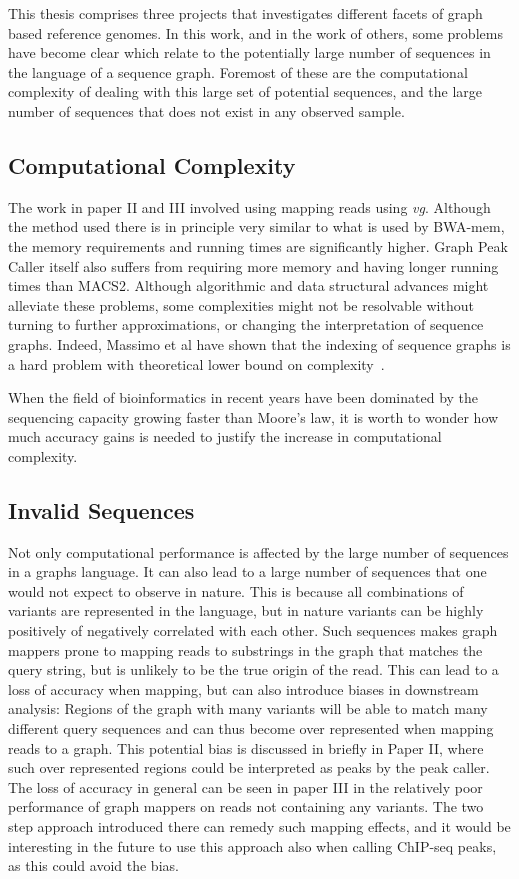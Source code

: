 This thesis comprises three projects that investigates different facets of graph based reference genomes.
In this work, and in the work of others, some problems have become clear which relate to the potentially large number of sequences in the language of a sequence graph. Foremost of these are the computational complexity of dealing with this large set of potential sequences, and the large number of sequences that does not exist in any observed sample.

\subsection{Computational Complexity}
The work in paper II and III involved using mapping reads using \emph{vg}.
Although the method used there is in principle very similar to what is used by BWA-mem, the memory requirements and running times are significantly higher.
Graph Peak Caller itself also suffers from requiring more memory and having longer running times than MACS2. 
Although algorithmic and data structural advances might alleviate these problems, some complexities might not be resolvable without turning to further approximations, or changing the interpretation of sequence graphs.
Indeed, Massimo et al have shown that the indexing of sequence graphs is a hard problem with theoretical lower bound on complexity~\cite{indexcomplexity}.

When the field of bioinformatics in recent years have been dominated by the sequencing capacity growing faster than Moore's law, it is worth to wonder how much accuracy gains is needed to justify the increase in computational complexity.

\subsection{Invalid Sequences}
Not only computational performance is affected by the large number of sequences in a graphs language.
It can also lead to a large number of sequences that one would not expect to observe in nature.
This is because all combinations of variants are represented in the language, but in nature variants can be highly positively of negatively correlated with each other.
Such sequences makes graph mappers prone to mapping reads to substrings in the graph that matches the query string, but is unlikely to be the true origin of the read.
This can lead to a loss of accuracy when mapping, but can also introduce biases in downstream analysis: Regions of the graph with many variants will be able to match many different query sequences and can thus become over represented when mapping reads to a graph.
This potential bias is discussed in briefly in Paper II, where such over represented regions could be interpreted as peaks by the peak caller.
The loss of accuracy in general can be seen in paper III in the relatively poor performance of graph mappers on reads not containing any variants.
The two step approach introduced there can remedy such mapping effects, and it would be interesting in the future to use this approach also when calling ChIP-seq peaks, as this could avoid the bias.


